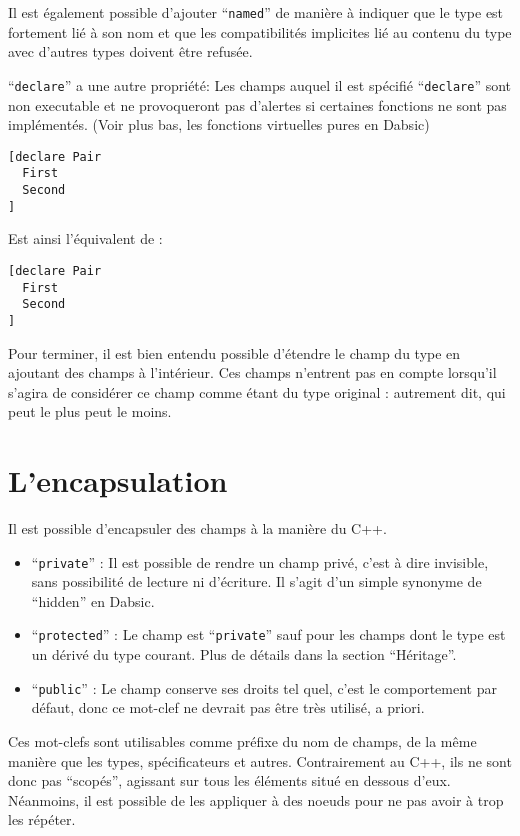\documentclass[a5paper, 12pt]{book}
\begin{document}
Il est également possible d'ajouter ``\verb!named!'' de manière
à indiquer que le type est fortement lié à son nom et que les compatibilités
implicites lié au contenu du type avec d'autres types doivent être refusée.

``\verb!declare!'' a une autre propriété: Les champs auquel il est
spécifié ``\verb!declare!'' sont non executable et ne provoqueront
pas d'alertes si certaines fonctions ne sont pas implémentés.
(Voir plus bas, les fonctions virtuelles pures en Dabsic)
\\

\begin{verbatim}
[declare Pair
  First
  Second
]
\end{verbatim}

Est ainsi l'équivalent de :\\

\begin{verbatim}
[declare Pair
  First
  Second
]
\end{verbatim}

Pour terminer, il est bien entendu possible d'étendre le champ
du type en ajoutant des champs à l'intérieur. Ces champs
n'entrent pas en compte lorsqu'il s'agira de considérer
ce champ comme étant du type original : autrement dit, qui
peut le plus peut le moins.

\section{L'encapsulation}

Il est possible d'encapsuler des champs à la manière du C++.

\begin{itemize}
  \item ``\verb!private!'' : Il est possible de rendre un champ
    privé, c'est à dire invisible, sans possibilité de lecture
    ni d'écriture. Il s'agit d'un simple synonyme de ``hidden''
    en Dabsic.
  \item ``\verb!protected!'' : Le champ est ``\verb!private!'' sauf pour
    les champs dont le type est un dérivé du type courant.
    Plus de détails dans la section ``Héritage''.
  \item ``\verb!public!'' : Le champ conserve ses droits tel quel,
    c'est le comportement par défaut, donc ce mot-clef ne
    devrait pas être très utilisé, a priori.
\end{itemize}

Ces mot-clefs sont utilisables comme préfixe du nom de champs,
de la même manière que les types, spécificateurs et autres.
Contrairement au C++, ils ne sont donc pas ``scopés'', agissant
sur tous les éléments situé en dessous d'eux. Néanmoins,
il est possible de les appliquer à des noeuds pour ne pas
avoir à trop les répéter.
\end{document}
